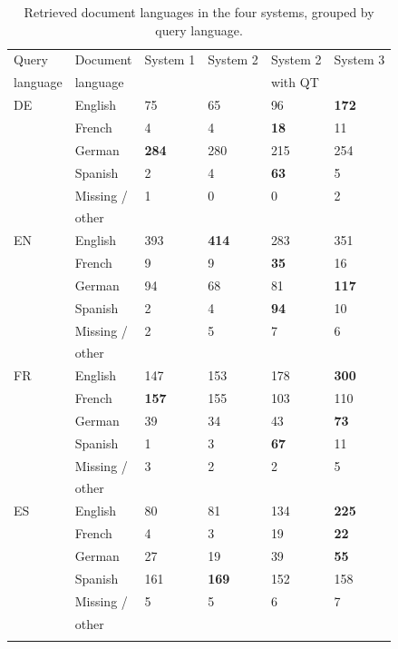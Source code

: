 \documentclass[a4paper,11pt]{article}
\begin{document}
\begin{table}[ht]
    \centering
    \begin{tabularx}{0.81\textwidth}{llllll}
\addlinespace
\toprule
\addlinespace
Query & Document & System 1 & System 2 & System 2 & System 3 \\
language & language & & & with QT & \\
\addlinespace
\cmidrule{1-6}
\addlinespace
DE & English & 75 & 65 & 96 & \textbf{172}  \\
\addlinespace
& French & 4 & 4 & \textbf{18} & 11 \\
\addlinespace
& German & \textbf{284} & 280 & 215 & 254 \\
\addlinespace
& Spanish & 2 & 4 & \textbf{63} & 5 \\
\addlinespace
& Missing / & 1 & 0 & 0 & 2 \\
& other & & & & \\
\addlinespace
EN & English & 393 & \textbf{414} & 283 & 351 \\
\addlinespace
& French & 9 & 9 & \textbf{35} & 16 \\
\addlinespace
& German & 94 & 68 & 81 & \textbf{117} \\
\addlinespace
& Spanish & 2 & 4 & \textbf{94} & 10 \\
\addlinespace
& Missing / & 2 & 5 & 7 & 6 \\
& other & & & & \\
\addlinespace
FR & English & 147 & 153 & 178 & \textbf{300} \\
\addlinespace
& French & \textbf{157} & 155 & 103 & 110 \\
\addlinespace
& German & 39 & 34 & 43 & \textbf{73} \\
\addlinespace
& Spanish & 1 & 3 & \textbf{67} & 11 \\
\addlinespace
& Missing / & 3 & 2 & 2 & 5 \\
&  other &&&& \\
\addlinespace
ES & English & 80 & 81 & 134 & \textbf{225} \\
\addlinespace
& French & 4 & 3 & 19 & \textbf{22} \\
\addlinespace
& German & 27 & 19 & 39 & \textbf{55} \\
\addlinespace
& Spanish & 161 & \textbf{169} & 152 & 158 \\
\addlinespace
& Missing / & 5 & 5 & 6 & 7 \\
& other &&&& \\
\addlinespace
\bottomrule
\end{tabularx}
\caption{Retrieved document languages in the four systems, grouped by query language.}
\label{tab:grouped_by_language}
\end{table}
\end{document}

